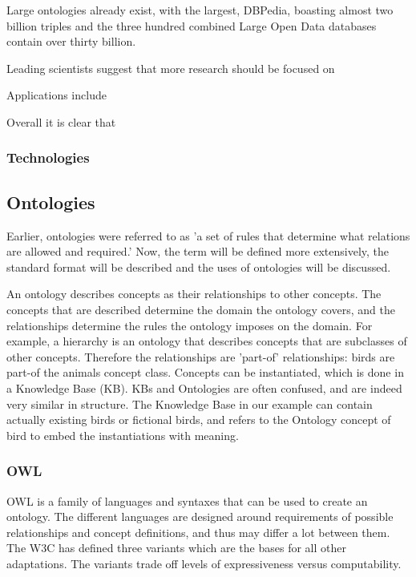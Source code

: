 \documentclass{article}
\begin{document}
 Large ontologies already exist, with the largest, DBPedia, boasting almost two billion triples and the three hundred combined Large Open Data databases contain over thirty billion. %
 
 Leading scientists suggest that more research should be focused on 
 
 
 
 Applications include
 
 Overall it is clear that %
 \subsubsection{Technologies}
 \subsection{Ontologies}
 Earlier, ontologies were referred to as 'a set of rules that determine what relations are allowed and required.' Now, the term will be defined more extensively, the standard format will be described and the uses of ontologies will be discussed.
 
 An ontology describes concepts as their relationships to other concepts. The concepts that are described determine the domain the ontology covers, and the relationships determine the rules the ontology imposes on the domain. For example, a hierarchy is an ontology that describes concepts that are subclasses of other concepts. Therefore the relationships are 'part-of' relationships: birds are part-of the animals concept class.
 Concepts can be instantiated, which is done in a Knowledge Base (KB). KBs and Ontologies are often confused, and are indeed very similar in structure. The Knowledge Base in our example can contain actually existing birds or fictional birds, and refers to the Ontology concept of bird to embed the instantiations with meaning.
 \subsubsection{OWL}
 OWL is a family of languages and syntaxes that can be used to create an ontology. The different languages are designed around requirements of possible relationships and concept definitions, and thus may differ a lot between them. The W3C has defined three variants which are the bases for all other adaptations. The variants trade off levels of expressiveness versus computability.
\end{document}
